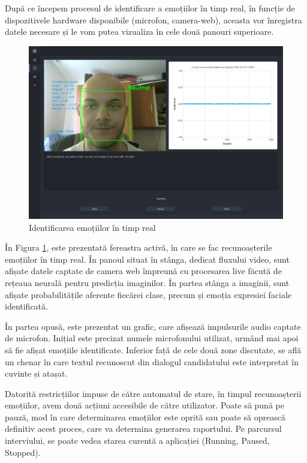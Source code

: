 \documentclass[a4paper, 12pt]{report}
\begin{document}
	După ce începem procesul de identificare a emoțiilor în timp real, în funcție de dispozitivele hardware disponibile (microfon, camera-web), aceasta vor înregistra datele necesare și le vom putea vizualiza în cele două panouri superioare.
	
	\begin{figure}[H]
		\begin{center}
			\includegraphics[scale=0.35]{images/emotion_recognition.png}
		\end{center}
		\caption{Identificarea emoțiilor în timp real}
		\label{fig:emotion_recog}
	\end{figure} 

	În Figura \ref{fig:emotion_recog}, este prezentată fereastra activă, în care se fac recunoașterile emoțiilor în timp real. În panoul situat în stânga, dedicat fluxului video, sunt afișate datele captate de camera web împreună cu procesarea live făcută de rețeaua neurală pentru predicția imaginilor. În partea stânga a imaginii, sunt afișate probabilitățile aferente fiecărei clase, precum și emoția expresiei faciale identificată. 

	În partea opusă, este prezentat un grafic, care afișează impulsurile audio captate de microfon. Inițial este precizat numele microfonului utilizat, urmând mai apoi să fie afișat emoțiile identificate. Inferior față de cele două zone discutate, se află un chenar în care textul recunoscut din dialogul candidatului este interpretat în cuvinte și atașat.

	Datorită restricțiilor impuse de către automatul de stare, în timpul recunoașterii emoțiilor, avem două acțiuni accesibile de către utilizator. Poate să pună pe pauză, mod în care determinarea emoțiilor este oprită sau poate să oprească definitiv acest proces, care va determina generarea raportului. Pe parcursul interviului, se poate vedea starea curentă a aplicației (Running, Paused, Stopped).
\end{document}
